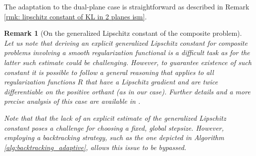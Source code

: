\documentclass[letterpaper]{article}
\newtheorem{remark}{Remark}
\begin{document}
The adaptation to the
dual-plane case is straightforward as described in Remark \ref{rmk: lipschitz constant of KL in 2 planes ism}.


\begin{remark}[On the generalized Lipschitz constant of the composite problem]
Let us note that deriving an explicit generalized Lipschitz constant for composite problems involving a smooth regularization functional is a difficult task as for the latter such estimate could be challenging. However, to guarantee existence of such constant it is possible to follow a general reasoning that applies to all regularization functions $R$ that have a Lipschitz gradient and are twice differentiable on the positive orthant (as in our case). Further details and a more precise analysis of this case are available in \cite[Section B.3.3]{Daniele2026}.






Note that that the lack of an explicit estimate of the generalized Lipschitz constant poses a challenge for choosing a fixed, global stepsize. However, employing a backtracking strategy, such as the one depicted in Algorithm \ref{alg:backtracking_adaptive}, allows this issue to be bypassed.
\end{remark}
\end{document}
